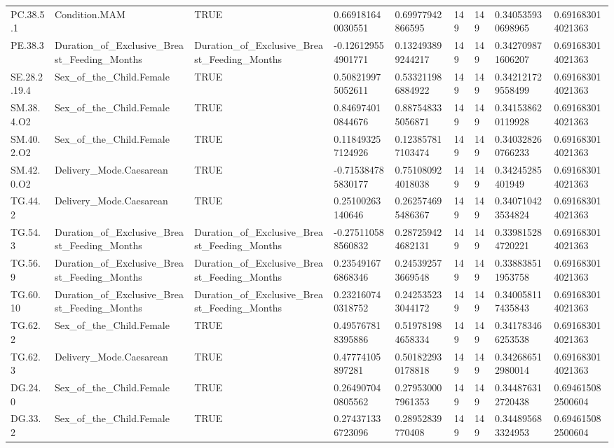 \begin{longtable}{lllllllll}
PC.38.5.1 & Condition.MAM & TRUE & 0.669181640030551 & 0.69977942866595 & 149 & 149 & 0.340535930698965 & 0.691683014021363 \\
PE.38.3 & Duration\_of\_Exclusive\_Breast\_Feeding\_Months & Duration\_of\_Exclusive\_Breast\_Feeding\_Months & -0.126129554901771 & 0.132493899244217 & 149 & 149 & 0.342709871606207 & 0.691683014021363 \\
SE.28.2.19.4 & Sex\_of\_the\_Child.Female & TRUE & 0.508219975052611 & 0.533211986884922 & 149 & 149 & 0.342121729558499 & 0.691683014021363 \\
SM.38.4.O2 & Sex\_of\_the\_Child.Female & TRUE & 0.846974010844676 & 0.887548335056871 & 149 & 149 & 0.341538620119928 & 0.691683014021363 \\
SM.40.2.O2 & Sex\_of\_the\_Child.Female & TRUE & 0.118493257124926 & 0.123857817103474 & 149 & 149 & 0.340328260766233 & 0.691683014021363 \\
SM.42.0.O2 & Delivery\_Mode.Caesarean & TRUE & -0.715384785830177 & 0.751080924018038 & 149 & 149 & 0.34245285401949 & 0.691683014021363 \\
TG.44.2 & Delivery\_Mode.Caesarean & TRUE & 0.25100263140646 & 0.262574695486367 & 149 & 149 & 0.340710423534824 & 0.691683014021363 \\
TG.54.3 & Duration\_of\_Exclusive\_Breast\_Feeding\_Months & Duration\_of\_Exclusive\_Breast\_Feeding\_Months & -0.275110588560832 & 0.287259424682131 & 149 & 149 & 0.339815284720221 & 0.691683014021363 \\
TG.56.9 & Duration\_of\_Exclusive\_Breast\_Feeding\_Months & Duration\_of\_Exclusive\_Breast\_Feeding\_Months & 0.235491676868346 & 0.245392573669548 & 149 & 149 & 0.338838511953758 & 0.691683014021363 \\
TG.60.10 & Duration\_of\_Exclusive\_Breast\_Feeding\_Months & Duration\_of\_Exclusive\_Breast\_Feeding\_Months & 0.232160740318752 & 0.242535233044172 & 149 & 149 & 0.340058117435843 & 0.691683014021363 \\
TG.62.2 & Sex\_of\_the\_Child.Female & TRUE & 0.495767818395886 & 0.519781984658334 & 149 & 149 & 0.341783466253538 & 0.691683014021363 \\
TG.62.3 & Delivery\_Mode.Caesarean & TRUE & 0.47774105897281 & 0.501822930178818 & 149 & 149 & 0.342686512980014 & 0.691683014021363 \\
DG.24.0 & Sex\_of\_the\_Child.Female & TRUE & 0.264907040805562 & 0.279530007961353 & 149 & 149 & 0.344876312720438 & 0.694615082500604 \\
DG.33.2 & Sex\_of\_the\_Child.Female & TRUE & 0.274371336723096 & 0.28952839770408 & 149 & 149 & 0.344895683324953 & 0.694615082500604 \\

\end{longtable}

